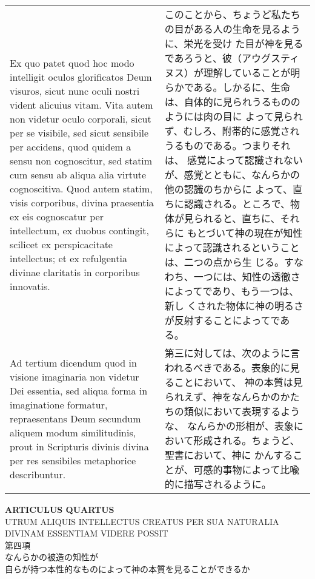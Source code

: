 \documentclass[10pt]{jsarticle} %
\begin{document}
\begin{longtable}{p{21em}p{21em}}
\\

Ex quo patet quod hoc modo intelligit oculos glorificatos Deum
visuros, sicut nunc oculi nostri vident alicuius vitam. Vita autem non
videtur oculo corporali, sicut per se visibile, sed sicut sensibile
per accidens, quod quidem a sensu non cognoscitur, sed statim cum
sensu ab aliqua alia virtute cognoscitiva. Quod autem statim, visis
corporibus, divina praesentia ex eis cognoscatur per intellectum, ex
duobus contingit, scilicet ex perspicacitate intellectus; et ex
refulgentia divinae claritatis in corporibus innovatis.

&

このことから、ちょうど私たちの目がある人の生命を見るように、栄光を受け
た目が神を見るであろうと、彼（アウグスティヌス）が理解していることが明
らかである。しかるに、生命は、自体的に見られうるもののようには肉の目に
よって見られず、むしろ、附帯的に感覚されうるものである。つまりそれは、
感覚によって認識されないが、感覚とともに、なんらかの他の認識のちからに
よって、直ちに認識される。ところで、物体が見られると、直ちに、それらに
もとづいて神の現在が知性によって認識されるということは、二つの点から生
じる。すなわち、一つには、知性の透徹さによってであり、もう一つは、新し
くされた物体に神の明るさが反射することによってである。



\\


{\sc Ad tertium dicendum} quod in visione imaginaria non videtur Dei
essentia, sed aliqua forma in imaginatione formatur, repraesentans
Deum secundum aliquem modum similitudinis, prout in Scripturis divinis
divina per res sensibiles metaphorice describuntur.

&

第三に対しては、次のように言われるべきである。表象的に見ることにおいて、
神の本質は見られえず、神をなんらかのかたちの類似において表現するような、
なんらかの形相が、表象において形成される。ちょうど、聖書において、神に
かんすることが、可感的事物によって比喩的に描写されるように。


\end{longtable}

\newpage
{}



 \begin{center}
  {\Large {\bf ARTICULUS QUARTUS}}\\
{\large UTRUM ALIQUIS INTELLECTUS CREATUS PER SUA NATURALIA\\
DIVINAM ESSENTIAM VIDERE POSSIT}\\
{\large 第四項\\なんらかの被造の知性が\\自らが持つ本性的なものによって神の本質を見ることができるか}
 \end{center}
\end{document}
